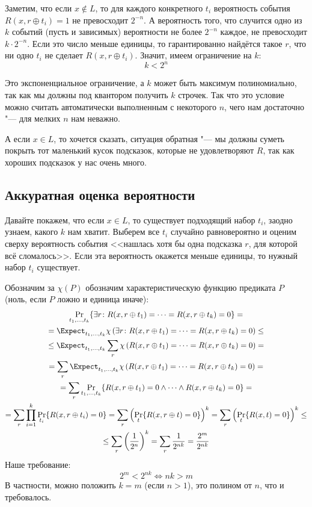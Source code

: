 	Заметим, что если $x \notin L$, то для каждого конкретного $t_i$ вероятность события $R(x, r \oplus t_i)=1$ не превосходит $2^{-n}$.
	А вероятность того, что случится одно из $k$ событий (пусть и зависимых) вероятности не более $2^{-n}$ каждое, не превосходит $k \cdot 2^{-n}$.
	Если это число меньше единицы, то гарантированно найдётся такое $r$, что ни одно $t_i$ не сделает $R(x, r \oplus t_i)$.
	Значит, имеем ограничение на $k$:
	\[ k < 2^n \]
	\begin{Rem}
		Это экспоненциальное ограничение, а $k$ может быть максимум полиномиально, так как мы должны под квантором получить $k$ строчек.
		Так что это условие можно считать автоматически выполненным с некоторого $n$, чего нам достаточно "--- для мелких $n$ нам неважно.
	\end{Rem}

	А если $x \in L$, то хочется сказать, ситуация обратная "--- мы должны суметь покрыть тот маленький кусок
	подсказок, которые не удовлетворяют $R$, так как хороших подсказок у нас очень много.

\subsection{Аккуратная оценка вероятности}
	Давайте покажем, что если $x \in L$, то существует подходящий набор $t_i$, заодно узнаем, какого $k$ нам хватит.
	Выберем все $t_i$ случайно равновероятно и оценим сверху вероятность события <<нашлась хотя бы одна подсказка $r$, для которой всё сломалось>>.
	Если эта вероятность окажется меньше единицы, то нужный набор $t_i$ существует.

	Обозначим за $\chi(P)$ обозначим характеристическую функцию предиката $P$ (ноль, если $P$ ложно и единица иначе):
	\begin{gather*}
		\Pr_{t_1, \dots, t_k} \{ \exists r \colon R(x, r \oplus t_1) = \dots = R(x, r \oplus t_k) = 0 \} = \\
		= \Expect_{t_1, \dots, t_k} \chi\left(\exists r \colon R(x, r \oplus t_1) = \dots = R(x, r \oplus t_k) = 0\right) \le  \\
		\le \Expect_{t_1, \dots, t_k} \sum_r \chi\left(R(x, r \oplus t_1) = \dots = R(x, r \oplus t_k) = 0\right) = \\
		= \sum_r \Expect_{t_1, \dots, t_k} \chi\left(R(x, r \oplus t_1) = \dots = R(x, r \oplus t_k) = 0\right) = \\
		= \sum_r \Pr_{t_1, \dots, t_k} \{ R(x, r \oplus t_1) = 0 \land \dots \land R(x, r \oplus t_k) = 0 \} = \\
		= \sum_r \prod_{i=1}^k \Pr_{t_i} \{ R(x, r \oplus t_i) = 0 \}
		= \sum_r \left(\Pr_{t} \{ R(x, r \oplus t) = 0 \} \right)^k
		= \sum_r \left(\Pr_{t} \{ R(x, t) = 0 \} \right)^k \le \\
		\le \sum_r \left(\frac{1}{2^{n}} \right)^k
		= \sum_r \frac{1}{2^{nk}}
		= \frac{2^m}{2^{nk}}
	\end{gather*}
	Наше требование:
	\[ 2^m < 2^{nk} \iff nk > m \]
	В частности, можно положить $k=m$ (если $n>1$), это полином от $n$, что и требовалось.


